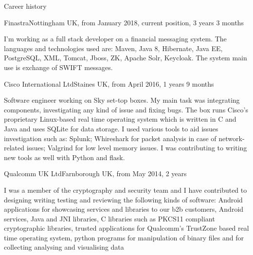 \documentclass{resume}
\begin{document}
  \begin{rSection}{Career history}
     
    \begin{rSubsection}{Finastra}{Nottingham UK, from January 2018, current position, 3 years 3 months}{}{}
   \item[]
      I'm working as a full stack developer on a financial messaging system. The languages and technologies used are: Maven, Java 8, Hibernate, Java EE, PostgreSQL, XML, Tomcat, Jboss, ZK, Apache Solr, Keycloak. The system main use is exchange of SWIFT messages.
    \end{rSubsection}

   
    \begin{rSubsection}{Cisco International Ltd}{Staines UK, from April 2016, 1 years 9 months}{}{}
    \item[]
      Software engineer working on Sky set-top boxes.
      My main task was integrating components, investigating any kind of issue and fixing bugs. 
      The box runs Cisco's proprietary Linux-based real time operating system which is written in C and Java and uses SQLite for data storage.
      I used various tools to aid issues investigation such as: Splunk; Whireshark for packet analysis in case of network-related issues; Valgrind for low level memory issues.
      I was contributing to writing new tools as well with Python and flask.
    \end{rSubsection}

    \begin{rSubsection}{Qualcomm UK Ltd}{Farnborough UK, from May 2014, 2 years}{}{}
	\item[]
	  I was a member of the cryptography and security team and I have contributed to designing writing testing and reviewing the following kinds of software:
	  Android applications for showcasing services and libraries to our b2b customers,
	  Android services, 
	  Java and JNI libraries, 
	  C libraries such as PKCS11 compliant cryptographic libraries,
	  trusted applications for Qualcomm's TrustZone based real time operating system,
	  python programs for manipulation of binary files and for collecting analysing and visualising data


\end{rSubsection}
\end{rSection}
\end{document}
